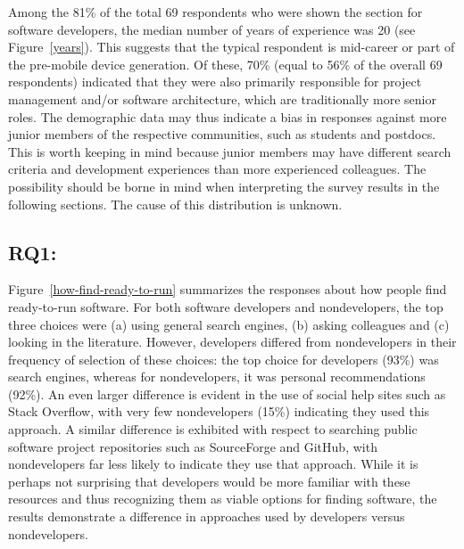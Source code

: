 \documentclass[review]{elsarticle}
\newcommand{\totalRespondents}{69\xspace}
\begin{document}
Among the 81\% of the total \totalRespondents respondents who were shown the section for software developers, the median number of years of experience was 20 (see Figure~\ref{years}). This suggests that the typical respondent is mid-career or part of the pre-mobile device generation.  Of these, 70\% (equal to 56\% of the overall \totalRespondents respondents) indicated that they were also primarily responsible for project management and/or software architecture, which are traditionally more senior roles.  The demographic data may thus indicate a bias in responses against more junior members of the respective communities, such as students and postdocs.  This is worth keeping in mind because junior members may have different search criteria and development experiences than more experienced colleagues. The possibility should be borne in mind when interpreting the survey results in the following sections. The cause of this distribution is unknown.


\subsection{RQ1: \rqonetext}
\label{discussion-rqone}

Figure~\ref{how-find-ready-to-run} summarizes the responses about how people find ready-to-run software.  For both software developers and nondevelopers, the top three choices were (a) using general search engines, (b) asking colleagues and (c) looking in the literature.  However, developers differed from nondevelopers in their frequency of selection of these choices: the top choice for developers (93\%) was search engines, whereas for nondevelopers, it was personal recommendations (92\%).  An even larger difference is evident in the use of social help sites such as Stack Overflow, with very few nondevelopers (15\%) indicating they used this approach.  A similar difference is exhibited with respect to searching public software project repositories such as SourceForge and GitHub, with nondevelopers far less likely to indicate they use that approach.  While it is perhaps not surprising that developers would be more familiar with these resources and thus recognizing them as viable options for finding software, the results demonstrate a difference in approaches used by developers versus nondevelopers.

\end{document}
